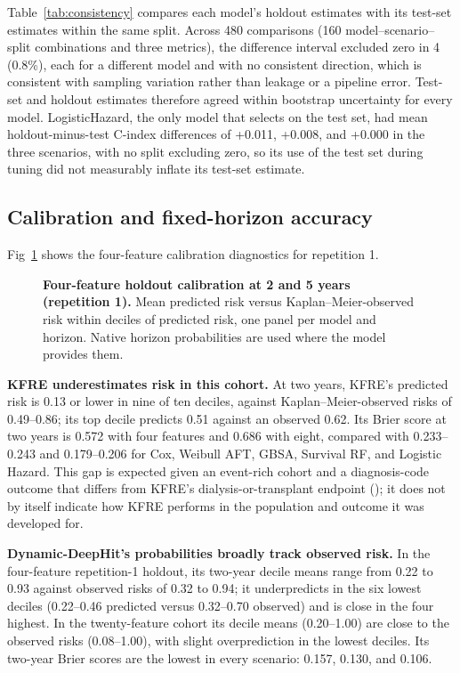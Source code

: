 \documentclass[10pt,letterpaper]{article}
\begin{document}
Table~\ref{tab:consistency} compares each model's holdout estimates with its test-set estimates within the same split. Across 480 comparisons (160 model--scenario--split combinations and three metrics), the difference interval excluded zero in 4 (0.8\%), each for a different model and with no consistent direction, which is consistent with sampling variation rather than leakage or a pipeline error. Test-set and holdout estimates therefore agreed within bootstrap uncertainty for every model. LogisticHazard, the only model that selects on the test set, had mean holdout-minus-test C-index differences of +0.011, +0.008, and +0.000 in the three scenarios, with no split excluding zero, so its use of the test set during tuning did not measurably inflate its test-set estimate.

\subsection*{Calibration and fixed-horizon accuracy} \label{sec:calibration_results}

Fig~\ref{fig:calibration_four} shows the four-feature calibration diagnostics for repetition 1.

\begin{figure}[h!]
    \centering
    \caption{{\bf Four-feature holdout calibration at 2 and 5 years (repetition 1).} Mean predicted risk versus Kaplan--Meier-observed risk within deciles of predicted risk, one panel per model and horizon. Native horizon probabilities are used where the model provides them.}
    \label{fig:calibration_four}
\end{figure}

\textbf{KFRE underestimates risk in this cohort.} At two years, KFRE's predicted risk is 0.13 or lower in nine of ten deciles, against Kaplan--Meier-observed risks of 0.49--0.86; its top decile predicts 0.51 against an observed 0.62. Its Brier score at two years is 0.572 with four features and 0.686 with eight, compared with 0.233--0.243 and 0.179--0.206 for Cox, Weibull AFT, GBSA, Survival RF, and Logistic Hazard. This gap is expected given an event-rich cohort and a diagnosis-code outcome that differs from KFRE's dialysis-or-transplant endpoint (); it does not by itself indicate how KFRE performs in the population and outcome it was developed for.

\textbf{Dynamic-DeepHit's probabilities broadly track observed risk.} In the four-feature repetition-1 holdout, its two-year decile means range from 0.22 to 0.93 against observed risks of 0.32 to 0.94; it underpredicts in the six lowest deciles (0.22--0.46 predicted versus 0.32--0.70 observed) and is close in the four highest. In the twenty-feature cohort its decile means (0.20--1.00) are close to the observed risks (0.08--1.00), with slight overprediction in the lowest deciles. Its two-year Brier scores are the lowest in every scenario: 0.157, 0.130, and 0.106.
\end{document}
